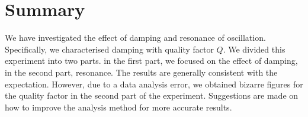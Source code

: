 \documentclass[a4paper,12pt]{article}
\begin{document}
\section{Summary}
We have investigated the effect of damping and resonance of oscillation. Specifically, we characterised damping with quality factor \( Q \). We divided this experiment into two parts. in the first part, we focused on the effect of damping, in the second part, resonance. The results are generally consistent with the expectation. However, due to a data analysis error, we obtained bizarre figures for the quality factor in the second part of the experiment. Suggestions are made on how to improve the analysis method for more accurate results.   


\end{document}
